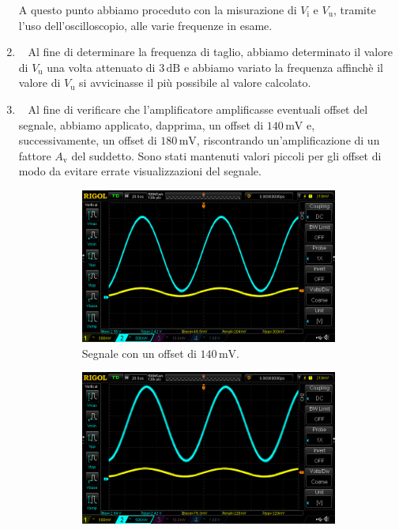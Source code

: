 \documentclass[a4paper]{article}
\begin{document}
\begin{enumerate}[label=\alph*.]
\begin{figure}[h!]
						\label{fig:segnaleCorrettoSlewRate}
					\end{figure}
					\newpage
					A questo punto abbiamo proceduto con la misurazione di $ V_{\mathrm{i}} $ e $ V_{\mathrm{u}} $, tramite l'uso dell'oscilloscopio, alle varie frequenze in esame.
				\item \label{item:b} \ 
					\newline
					Al fine di determinare la frequenza di taglio, abbiamo determinato il valore di $ V_{\mathrm{u}} $ una volta attenuato di $ 3 \, \mathrm{dB} $ e abbiamo variato la frequenza affinchè il valore di $ V_{\mathrm{u}} $ si avvicinasse il più possibile al valore calcolato.
				\item \ 
					\newline
					Al fine di verificare che l'amplificatore amplificasse eventuali offset del segnale, abbiamo applicato, dapprima, un offset di $ 140 \, \mathrm{mV} $ e, successivamente, un offset di $ 180 \, \mathrm{mV} $, riscontrando un'amplificazione di un fattore $ A_{\mathrm{v}} $ del suddetto.
					\newline
					Sono stati mantenuti valori piccoli per gli offset di modo da evitare errate visualizzazioni del segnale.
					\begin{figure}[h!]
						\centering
						\begin{subfigure}{0.4\textwidth}
							\centering
							\includegraphics[scale=0.2]{offset140}
							\caption{Segnale con un offset di $ 140 \, \mathrm{mV} $.}
						\end{subfigure}
						\begin{subfigure}{0.4\textwidth}
							\centering
							\includegraphics[scale=0.2]{offset180}

\end{subfigure}
\end{figure}
\end{enumerate}
\end{document}
